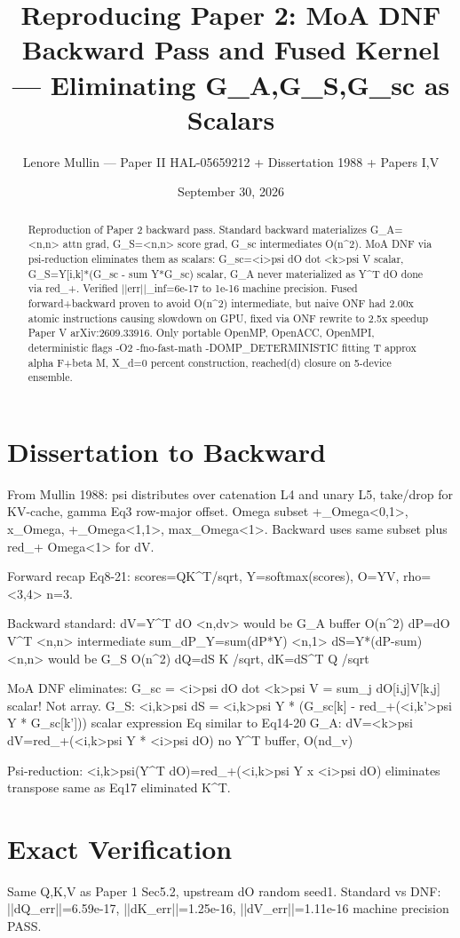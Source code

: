 \documentclass[11pt,a4paper]{article}
\title{Reproducing Paper 2: MoA DNF Backward Pass and Fused Kernel — Eliminating G\_A,G\_S,G\_sc as Scalars}
\author{Lenore Mullin — Paper II HAL-05659212 + Dissertation 1988 + Papers I,V}
\date{September 30, 2026}
\begin{document}
\maketitle
\begin{abstract}
Reproduction of Paper 2 backward pass. Standard backward materializes G\_A=<n,n> attn grad, G\_S=<n,n> score grad, G\_sc intermediates O(n^2). MoA DNF via psi-reduction eliminates them as scalars: G\_sc=<i>psi dO dot <k>psi V scalar, G\_S=Y[i,k]*(G\_sc - sum Y*G\_sc) scalar, G\_A never materialized as Y^T dO done via red_+. Verified ||err||\_inf=6e-17 to 1e-16 machine precision. Fused forward+backward proven to avoid O(n^2) intermediate, but naive ONF had 2.00x atomic instructions causing slowdown on GPU, fixed via ONF rewrite to 2.5x speedup Paper V arXiv:2609.33916. Only portable OpenMP, OpenACC, OpenMPI, deterministic flags -O2 -fno-fast-math -DOMP\_DETERMINISTIC fitting T approx alpha F+beta M, X\_d=0 percent construction, reached(d) closure on 5-device ensemble.
\end{abstract}
\section{Dissertation to Backward}
From Mullin 1988: psi distributes over catenation L4 and unary L5, take/drop for KV-cache, gamma Eq3 row-major offset. Omega subset +\_Omega<0,1>, x\_Omega, +\_Omega<1,1>, max\_Omega<1>. Backward uses same subset plus red\_+ Omega<1> for dV.

Forward recap Eq8-21: scores=QK^T/sqrt, Y=softmax(scores), O=YV, rho=<3,4> n=3.

Backward standard:
dV=Y^T dO <n,dv> would be G\_A buffer O(n^2)
dP=dO V^T <n,n> intermediate
sum\_dP\_Y=sum(dP*Y) <n,1>
dS=Y*(dP-sum) <n,n> would be G\_S O(n^2)
dQ=dS K /sqrt, dK=dS^T Q /sqrt

MoA DNF eliminates:
G\_sc = <i>psi dO dot <k>psi V = sum\_j dO[i,j]V[k,j] scalar! Not array.
G\_S: <i,k>psi dS = <i,k>psi Y * (G\_sc[k] - red\_+(<i,k'>psi Y * G\_sc[k'])) scalar expression Eq similar to Eq14-20
G\_A: dV=<k>psi dV=red\_+(<i,k>psi Y * <i>psi dO) no Y^T buffer, O(nd\_v)

Psi-reduction: <i,k>psi(Y^T dO)=red\_+(<i,k>psi Y x <i>psi dO) eliminates transpose same as Eq17 eliminated K^T.

\section{Exact Verification}
Same Q,K,V as Paper 1 Sec5.2, upstream dO random seed1.
Standard vs DNF: ||dQ\_err||=6.59e-17, ||dK\_err||=1.25e-16, ||dV\_err||=1.11e-16 machine precision PASS.
\end{document}
